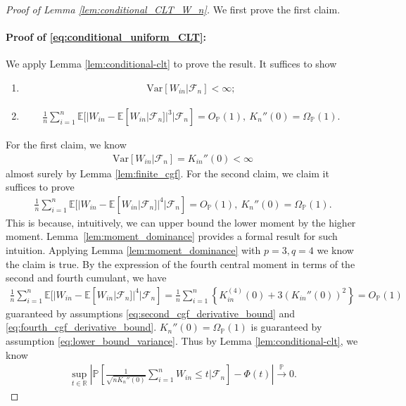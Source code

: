 \documentclass[12pt]{article}
\theoremstyle{definition}
\def\P{\mathbb{P}}
\def\P{\mathbb{P}}
\newcommand{\E}{\mathbb E}								%
\renewcommand{\P}{\mathbb{P}}							%
\newcommand{\convp}{\overset{\mathbb{P}}{\rightarrow}}             %
\begin{document}
\begin{proof}[Proof of Lemma \ref{lem:conditional_CLT_W_n}]
	We first prove the first claim.  
	\paragraph{Proof of \eqref{eq:conditional_uniform_CLT}:}
	We apply Lemma \ref{lem:conditional-clt} to prove the result. It suffices to show 
	\begin{enumerate}
		\item  
		\begin{align*}
			\mathrm{Var}[W_{in}|\mathcal{F}_n]<\infty;
		\end{align*}
		\item 
		\begin{align*}
			\frac{1}{n}\sum_{i=1}^n \E[|W_{in}-\E[W_{in}|\mathcal{F}_n]|^{3}|\mathcal{F}_n]=O_\P(1),\ K_n''(0)=\Omega_{\P}(1).
		\end{align*}
	\end{enumerate}
	For the first claim, we know 
	\begin{align*}
		\mathrm{Var}[W_{in}|\mathcal{F}_n]=K_{in}''(0)<\infty
	\end{align*}
	almost surely by Lemma \ref{lem:finite_cgf}. For the second claim, we claim it suffices to prove 
	\begin{align*}
		\frac{1}{n}\sum_{i=1}^n \E[|W_{in}-\E[W_{in}|\mathcal{F}_n]|^{4}|\mathcal{F}_n]=O_\P(1),\ K_n''(0)=\Omega_\P(1).
	\end{align*}
	This is because, intuitively, we can upper bound the lower moment by the higher moment. Lemma~\ref{lem:moment_dominance} provides a formal result for such intuition. Applying Lemma \ref{lem:moment_dominance} with $p=3,q=4$ we know the claim is true. By the expression of the fourth central moment in terms of the second and fourth cumulant, we have 
	\begin{align*}
		\frac{1}{n}\sum_{i=1}^n \E[|W_{in}-\E[W_{in}|\mathcal{F}_n]|^{4}|\mathcal{F}_n]=\frac{1}{n}\sum_{i=1}^n \left\{K_{in}^{(4)}(0)+3(K_{in}''(0))^2\right\}=O_{\P}(1)
	\end{align*}
	guaranteed by assumptions \eqref{eq:second_cgf_derivative_bound} and \eqref{eq:fourth_cgf_derivative_bound}. $K_n''(0)=\Omega_\P(1)$ is guaranteed by assumption \eqref{eq:lower_bound_variance}. Thus by Lemma \ref{lem:conditional-clt}, we know 
	\begin{align*}
		\sup_{t\in\mathbb{R}}\left|\P\left[\frac{1}{\sqrt{nK_n''(0)}}\sum_{i=1}^n W_{in}\leq t|\mathcal{F}_n\right]-\Phi(t)\right|\convp 0.
	\end{align*}


\end{proof}
\end{document}
